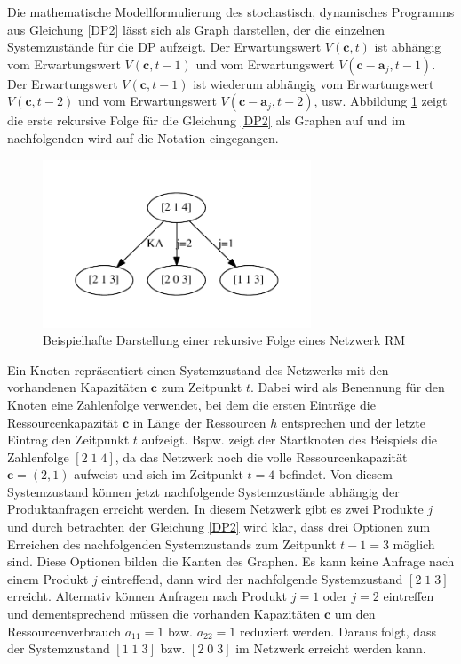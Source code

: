 Die mathematische Modellformulierung des stochastisch, dynamisches Programms aus Gleichung \eqref{DP2} lässt sich als Graph darstellen, der die einzelnen Systemzustände für die DP aufzeigt. Der Erwartungswert $V(\textbf{c},t)$ ist abhängig vom Erwartungswert $V(\textbf{c},t-1)$ und vom Erwartungswert $V(\textbf{c}-\textbf{a}_{j},t-1)$. Der Erwartungswert $V(\textbf{c},t-1)$ ist wiederum abhängig vom Erwartungswert $V(\textbf{c},t-2)$ und vom Erwartungswert $V(\textbf{c}-\textbf{a}_{j},t-2)$, usw. Abbildung \ref{B0} zeigt die erste rekursive Folge für die Gleichung \eqref{DP2} als Graphen auf und im nachfolgenden wird auf die Notation eingegangen.
\begin{figure}[h!]
  \begin{center}
    \includegraphics[width=80mm]{Bilder/Beispiel0.pdf}
    \caption{Beispielhafte Darstellung einer rekursive Folge eines Netzwerk RM}  \label{B0}
  \end{center}
\end{figure}

Ein Knoten repräsentiert einen Systemzustand des Netzwerks mit den vorhandenen Kapazitäten $\textbf{c}$ zum Zeitpunkt $t$. Dabei wird als Benennung für den Knoten eine Zahlenfolge verwendet, bei dem die ersten Einträge die Ressourcenkapazität $\textbf{c}$ in Länge der Ressourcen $h$ entsprechen und der letzte Eintrag den Zeitpunkt $t$ aufzeigt. Bspw. zeigt der Startknoten des Beispiels die Zahlenfolge $[2\;1\;4]$, da das Netzwerk noch die volle Ressourcenkapazität $\textbf{c}=(2,1)$ aufweist und sich im Zeitpunkt $t=4$ befindet. Von diesem Systemzustand können jetzt nachfolgende Systemzustände abhängig der Produktanfragen erreicht werden. In diesem Netzwerk gibt es zwei Produkte $j$ und durch betrachten der Gleichung \eqref{DP2} wird klar, dass drei Optionen zum Erreichen des nachfolgenden Systemzustands zum Zeitpunkt $t-1=3$ möglich sind. Diese Optionen bilden die Kanten des Graphen. Es kann keine Anfrage nach einem Produkt $j$ eintreffend, dann wird der nachfolgende Systemzustand $[2\;1\;3]$ erreicht. Alternativ können Anfragen nach Produkt $j=1$ oder $j=2$ eintreffen und dementsprechend müssen die vorhanden Kapazitäten $\textbf{c}$ um den Ressourcenverbrauch $a_{11}=1$ bzw. $a_{22}=1$ reduziert werden. Daraus folgt, dass der Systemzustand $[1\;1\;3]$ bzw. $[2\;0\;3]$ im Netzwerk erreicht werden kann.

